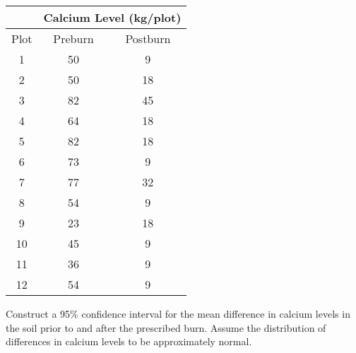 \documentclass{article}
\begin{document}
\begin{center}
\begin{tabular}{c c c}
    & \multicolumn{2}{c}{Calcium Level (kg/plot)}\\
    \hline
    Plot & Preburn & Postburn \\
    \hline
    1  & 50 & 9  \\
    2  & 50 & 18 \\
    3  & 82 & 45 \\
    4  & 64 & 18 \\
    5  & 82 & 18 \\
    6  & 73 & 9  \\
    7  & 77 & 32 \\
    8  & 54 & 9  \\
    9  & 23 & 18 \\
    10 & 45 & 9  \\
    11 & 36 & 9  \\
    12 & 54 & 9  \\
\end{tabular}
\end{center}
Construct a 95\% confidence interval for the mean 
difference in calcium levels in the soil prior to and 
after the prescribed burn. Assume the distribution of 
differences in calcium levels to be approximately normal.
\\\newline
\end{document}

